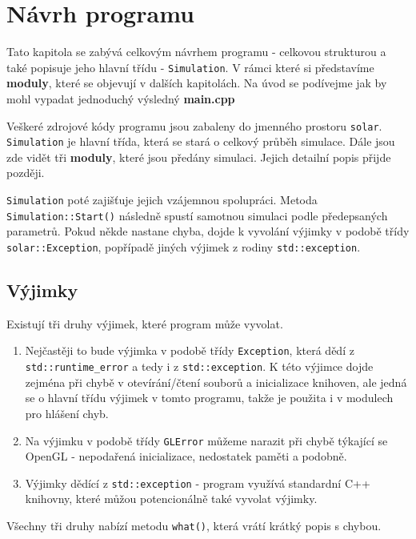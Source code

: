 
\chapter{Návrh programu}
\label{chap:implementace}
Tato kapitola se zabývá celkovým návrhem programu - celkovou strukturou a také popisuje jeho hlavní třídu - \texttt{Simulation}. V rámci které si představíme \textbf{moduly}, které se objevují v dalších kapitolách.
Na úvod se podívejme jak by mohl vypadat jednoduchý výsledný \textbf{main.cpp} 


Veškeré zdrojové kódy programu jsou zabaleny do jmenného prostoru \texttt{solar}. \texttt{Simulation} je hlavní třída, která se stará o celkový průběh simulace. Dále jsou zde vidět tři \textbf{moduly}, které jsou předány simulaci. Jejich detailní popis přijde později.

\texttt{Simulation} poté zajišťuje jejich vzájemnou spolupráci. Metoda \texttt{Simulation::Start()} následně spustí samotnou simulaci podle předepsaných parametrů.
Pokud někde nastane chyba, dojde k vyvolání výjimky v podobě třídy \texttt{solar::Exception}, popřípadě jiných výjimek z rodiny \texttt{std::exception}.




\section{Výjimky}
Existují tři druhy výjimek, které program může vyvolat.
\begin{enumerate}
	\item Nejčastěji to bude výjimka v podobě třídy \texttt{Exception}, která dědí 
	z \texttt{std::runtime\_error} a tedy i z \texttt{std::exception}. K této výjimce dojde zejména při chybě v otevírání/čtení souborů a inicializace knihoven, ale jedná se o hlavní třídu výjimek v tomto programu, takže je použita i v modulech pro hlášení chyb.
	\item Na výjimku v podobě třídy \texttt{GLError} můžeme narazit při chybě týkající se OpenGL - nepodařená inicializace, nedostatek paměti a podobně.
\item Výjimky dědící z \texttt{std::exception} - program využívá standardní C++ knihovny, které můžou potencionálně také vyvolat výjimky.
\end{enumerate}
Všechny tři druhy nabízí metodu \texttt{what()}, která vrátí krátký popis s chybou.